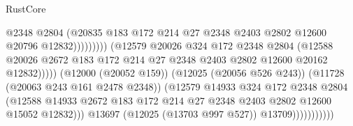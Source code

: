 \begin{lexlean}{RustCore}
\begin{coremodule}
                                                  @2348
                                                  @2804
                                                  (@20835
                                                    @183
                                                    @172
                                                    @214
                                                    @27
                                                    @2348
                                                    @2403
                                                    @2802
                                                    @12600
                                                    @20796
                                                    @12832)))))))))
                                  (@12579
                                    @20026
                                    @324
                                    @172
                                    @2348
                                    @2804
                                    (@12588
                                      @20026
                                      @2672
                                      @183
                                      @172
                                      @214
                                      @27
                                      @2348
                                      @2403
                                      @2802
                                      @12600
                                      @20162
                                      @12832)))))
                            (@12000 (@20052 @159))
                            (@12025 (@20056 @526 @243))
                            (@11728 (@20063 @243 @161 @2478 @2348))
                            (@12579
                              @14933
                              @324
                              @172
                              @2348
                              @2804
                              (@12588
                                @14933
                                @2672
                                @183
                                @172
                                @214
                                @27
                                @2348
                                @2403
                                @2802
                                @12600
                                @15052
                                @12832)))
                          @13697
                          (@12025 (@13703 @997 @527))
                          @13709)))))))))))

\end{coremodule}
\end{lexlean}
